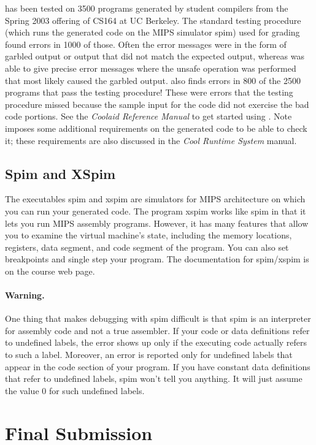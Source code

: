 \documentclass[11pt]{article}
\def\U#1{{\sf{}#1}}
\begin{document}
\Coolaid{} has been tested on 3500 programs generated by student
compilers from the Spring 2003 offering of CS164 at UC Berkeley. The
standard testing procedure (which runs the generated code on the MIPS
simulator \U{spim}) used for grading found errors in 1000 of
those. Often the error messages were in the form of garbled output or
output that did not match the expected output, whereas \Coolaid{} was
able to give precise error messages where the unsafe operation was
performed that most likely caused the garbled output.  \Coolaid{}
also finds errors in 800 of the 2500 programs that pass the testing
procedure! These were errors that the testing procedure missed because
the sample input for the code did not exercise the bad code portions.
See the \emph{Coolaid Reference Manual} to get started using
\Coolaid{}.  Note \Coolaid{} imposes some additional requirements on
the generated code to be able to check it; these requirements are also
discussed in the \emph{Cool Runtime System} manual.

\subsection{Spim and XSpim}

The executables \U{spim} and \U{xspim} are simulators for MIPS
architecture on which you can run your generated code.  The program
\U{xspim} works like \U{spim} in that it lets you run MIPS assembly
programs. However, it has many features that allow you to examine the
virtual machine's state, including the memory locations, registers,
data segment, and code segment of the program. You can also set
breakpoints and single step your program.  The documentation for
\U{spim}/\U{xspim} is on the course web page.

\paragraph{Warning.} One thing that makes debugging with \U{spim} difficult is
that \U{spim} is an interpreter for assembly code and not a true
assembler.  If your code or data definitions refer to undefined
labels, the error shows up only if the executing code actually refers
to such a label. Moreover, an error is reported only for undefined
labels that appear in the code section of your program. If you have
constant data definitions that refer to undefined labels, \U{spim}
won't tell you anything. It will just assume the value 0 for such
undefined labels.

\section{Final Submission}
\end{document}
